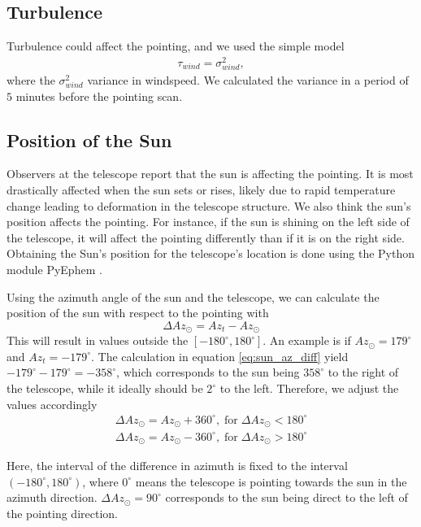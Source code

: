 \subsection{Turbulence}
Turbulence could affect the pointing, and we used the simple model
\begin{align}
\tau_\textit{wind} = \sigma_\textit{wind}^2,
\end{align}
where the $\sigma_\textit{wind}^2$ variance in windspeed.
We calculated the variance in a period of $5$ minutes before the pointing scan.

\subsection{Position of the Sun}
Observers at the telescope report that the sun is affecting the pointing.
It is most drastically affected when the sun sets or rises, likely due to rapid temperature change leading to deformation in the telescope structure.
We also think the sun's position affects the pointing.
For instance, if the sun is shining on the left side of the telescope, it will affect the pointing differently than if it is on the right side.
Obtaining the Sun's position for the telescope's location is done using the Python module PyEphem \cite{ephem}.

Using the azimuth angle of the sun and the telescope, we can calculate the position of the sun with respect to the pointing with
\begin{equation}\label{eq:sun_az_diff}
    \Delta \textit{Az}_\odot = \textit{Az}_{\textit{t}} - \textit{Az}_\odot
\end{equation}
This will result in values outside the $[-180^\circ,180^\circ]$. An example is if $Az_\odot=179^\circ$ and $Az_t = -179^\circ$.
The calculation in equation \eqref{eq:sun_az_diff} yield $-179^\circ-179^\circ=-358^\circ$,
which corresponds to the sun being $358^\circ$ to the right of the telescope, while it ideally should be $2^\circ$ to the left.
Therefore, we adjust the values accordingly
\begin{align}
    \Delta Az_\odot = Az_\odot +360^\circ, \; \text{for} \; \Delta Az_\odot < 180^\circ\\
    \Delta Az_\odot = Az_\odot -360^\circ, \; \text{for} \; \Delta Az_\odot > 180^\circ
\end{align}

Here, the interval of the difference in azimuth is fixed to the interval $(-180^\circ,180^\circ)$,
where $0^\circ$ means the telescope is pointing towards the sun in the azimuth direction.
$\Delta \textit{Az}_\odot = 90^\circ$ corresponds to the sun being direct to the left of the pointing direction.

